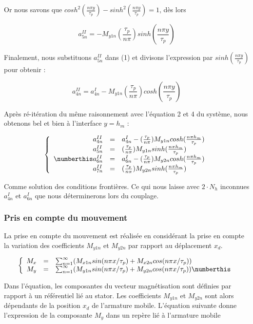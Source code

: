 Or nous savons que $cosh^2(\frac{n\pi y}{\tau_p})-sinh^2(\frac{n\pi y}{\tau_p})=1$, dès lors 

\begin{equation}
    a_{5n}^{II}=-M_{y1n}(\frac{\tau_p}{n\pi})sinh(\frac{n\pi y}{\tau_p})
\end{equation}

Finalement, nous substituons $a_{5n}^{II}$ dans (1) et divisons l'expression par $sinh(\frac{n\pi y}{\tau_p})$ pour obtenir : 

\begin{equation}
    a_{4n}^{II} =a_{4n}^{I}-M_{y1n}(\frac{\tau_p}{n\pi})cosh(\frac{n\pi y}{\tau_p})
\end{equation}

Après ré-itération du même raisonnement avec l'équation 2 et 4 du système, nous obtenons bel et bien à l'interface $y=h_m$ :

\[
\left\{
\begin{array}{r c l}
a_{4n}^{II}&=&a_{4n}^I-(\frac{\tau_p}{n\pi})M_{y1n}cosh(\frac{n\pi h_m}{\tau_p})\\
a_{5n}^{II} &=& (\frac{\tau_p}{n\pi})M_{y1n}sinh(\frac{n\pi h_m}{\tau_p})\\ \numberthis
a_{6n}^{II}&=&a_{6n}^I-(\frac{\tau_p}{n\pi})M_{y2n}cosh(\frac{n\pi h_m}{\tau_p})\\
a_{7n}^{II} &=& (\frac{\tau_p}{n\pi})M_{y2n}sinh(\frac{n\pi h_m}{\tau_p})\\
\end{array}
\right.
\]

Comme solution des conditions frontières. Ce qui nous laisse avec $2\cdot N_h$ inconnues $a_{4n}^I$ et $a_{6n}^I$ que nous déterminerons lors du couplage.

\subsubsection{Pris en compte du mouvement}
La prise en compte du mouvement est réalisée en considérant la prise en compte la variation des coefficients $M_{y1n}$ et $M_{y2n}$ par rapport au déplacement $x_d$.

\[
\left\{
\begin{array}{r c l}
M_x &=& \sum_{n=1}^\infty(M_{x1n}sin(n\pi x/\tau_p)+M_{x2n}cos(n\pi x/\tau_p))\\
M_y &=& \sum_{n=1}^\infty(M_{y1n}sin(n\pi x/\tau_p)+M_{y2n}cos(n\pi x/\tau_p))\numberthis
\end{array}
\right.
\]

Dans l'équation,  les composantes du vecteur magnétisation sont définies par rapport à un référentiel lié au stator. Les coefficients $M_{y1n}$ et $M_{y2n}$ sont alors dépendants de la position $x_d$ de l'armature mobile. L'équation suivante donne l'expression de la composante $M_y$ dans un repère lié à l'armature mobile

